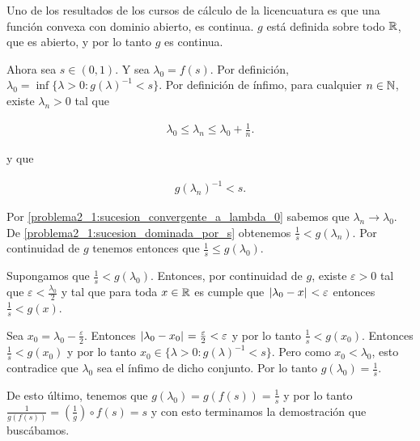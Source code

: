    Uno de los resultados de los cursos de cálculo de la licencuatura es que una función convexa con dominio abierto, es continua.
    $g$ está definida sobre todo $\mathbb{R}$, que es abierto, y por lo tanto $g$ es continua.\par\null
    
    Ahora sea $s \in (0,1)$. Y sea $\lambda_0 = f(s)$. Por definición, $\lambda_0 = \inf\{ \lambda > 0 : g(\lambda)^{-1} < s\}$. Por definición de ínfimo,
    para cualquier $n \in \mathbb{N}$, existe $\lambda_n > 0$ tal que 
    
    \begin{align}
        \lambda_0 \leq \lambda_n \leq \lambda_0 + \frac{1}{n}. \label{problema2_1:sucesion_convergente_a_lambda_0}
    \end{align}\par\null
     
    y que
    
    \begin{align}
        g(\lambda_n)^{-1} < s. \label{problema2_1:sucesion_dominada_por_s}
    \end{align}\par\null
    
    Por \eqref{problema2_1:sucesion_convergente_a_lambda_0} sabemos que $\lambda_n \rightarrow \lambda_0$.
    De \eqref{problema2_1:sucesion_dominada_por_s} obtenemos $\frac{1}{s} < g(\lambda_n)$. Por continuidad de $g$
    tenemos entonces que $\frac{1}{s} \leq g(\lambda_0)$.\par\null
    
    Supongamos que $\frac{1}{s} < g(\lambda_0)$. Entonces, por continuidad de $g$, existe $\varepsilon > 0$ tal que
    $\varepsilon < \frac{\lambda_0}{2}$ y tal que para toda $x \in \mathbb{R}$ es cumple que $\hspace{.25mm}\left|\lambda_0 - x\right|\hspace{.25mm} < \varepsilon$ 
    entonces $\frac{1}{s} < g(x)$.\par\null
    
    Sea $x_0 = \lambda_0 - \frac{\varepsilon}{2}$. Entonces $\hspace{.25mm}\left|\lambda_0 - x_0\right|\hspace{.25mm} = \frac{\varepsilon}{2} <    \varepsilon$ y por lo tanto
    $\frac{1}{s}<g(x_0)$. Entonces $\frac{1}{s} < g(x_0)$ y por lo tanto $x_0 \in \{ \lambda > 0 : g(\lambda)^{-1} < s \}$.
    Pero como $x_0 < \lambda_0$, esto contradice que $\lambda_0$ sea el ínfimo de dicho conjunto. Por lo tanto
    $g(\lambda_0) = \frac{1}{s}$.\par\null
    
    De esto último, tenemos que $g(\lambda_0) = g(f(s)) = \frac{1}{s}$ y por lo tanto \\
    $\frac{1}{g(f(s))} = (\frac{1}{g}) \circ f (s) = s$ y con esto terminamos la demostración que buscábamos.\par\null
    
